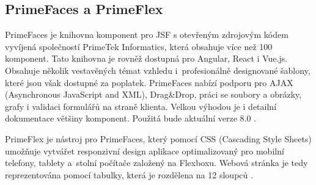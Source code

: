 



\subsection*{PrimeFaces a PrimeFlex}

PrimeFaces je knihovna komponent pro JSF s otevřeným zdrojovým kódem vyvíjená společností PrimeTek Informatics, která obsahuje více než 100 komponent. Tato knihovna je rovněž dostupná pro Angular, React i Vue.js. Obsahuje několik vestavěných témat vzhledu i~profesionálně designované šablony, které jsou však dostupné za poplatek. PrimeFaces nabízí podporu pro AJAX (Asynchronous JavaScript and XML), Drag\&Drop, práci se soubory a obrázky, grafy i validaci formulářů na straně klienta. Velkou výhodou je i detailní dokumentace většiny komponent. Použitá bude aktuální verze 8.0 \cite{Technology_Primefaces}.



PrimeFlex je nástroj pro PrimeFaces, který pomocí CSS (Cascading Style Sheets) umožňuje vytvářet responzivní design aplikace optimalizovaný pro mobilní telefony, tablety a~stolní počítače založený na Flexboxu. Webová stránka je tedy reprezentována pomocí tabulky, která je rozdělena na 12 sloupců \cite{Technology_Primeflex}. 




